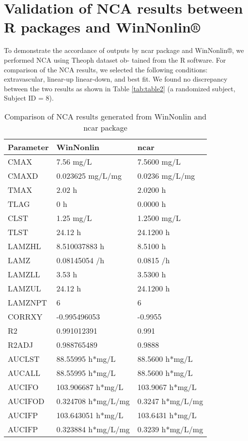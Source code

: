 \documentclass[12pt,]{krantz}
\theoremstyle{definition}
\theoremstyle{definition}
\theoremstyle{definition}
\theoremstyle{remark}
\begin{document}
\section{Validation of NCA results between R packages and
WinNonlin®}\label{validation-of-nca-results-between-r-packages-and-winnonlin}

To demonstrate the accordance of outputs by ncar package and WinNonlin®,
we performed NCA using Theoph dataset ob- tained from the R software.
For comparison of the NCA results, we selected the following conditions:
extravascular, linear-up linear-down, and best fit. We found no
discrepancy between the two results as shown in Table \ref{tab:table2}
(a randomized subject, Subject ID = 8).

\begin{table}

\caption{\label{tab:table3}Comparison of NCA results generated from WinNonlin and ncar package}
\centering
\begin{tabular}[t]{lll}
\toprule
Parameter & WinNonlin & ncar\\
\midrule
CMAX & 7.56 mg/L & 7.5600 mg/L\\
CMAXD & 0.023625 mg/L/mg & 0.0236 mg/L/mg\\
TMAX & 2.02 h & 2.0200 h\\
TLAG & 0 h & 0.0000 h\\
CLST & 1.25 mg/L & 1.2500 mg/L\\
\addlinespace
TLST & 24.12 h & 24.1200 h\\
LAMZHL & 8.510037883 h & 8.5100 h\\
LAMZ & 0.08145054 /h & 0.0815 /h\\
LAMZLL & 3.53 h & 3.5300 h\\
LAMZUL & 24.12 h & 24.1200 h\\
\addlinespace
LAMZNPT & 6 & 6\\
CORRXY & -0.995496053 & -0.9955\\
R2 & 0.991012391 & 0.991\\
R2ADJ & 0.988765489 & 0.9888\\
AUCLST & 88.55995 h*mg/L & 88.5600 h*mg/L\\
\addlinespace
AUCALL & 88.55995 h*mg/L & 88.5600 h*mg/L\\
AUCIFO & 103.906687 h*mg/L & 103.9067 h*mg/L\\
AUCIFOD & 0.324708 h*mg/L/mg & 0.3247 h*mg/L/mg\\
AUCIFP & 103.643051 h*mg/L & 103.6431 h*mg/L\\
AUCIFP & 0.323884 h*mg/L/mg & 0.3239 h*mg/L/mg\\

\end{tabular}
\end{table}
\end{document}
